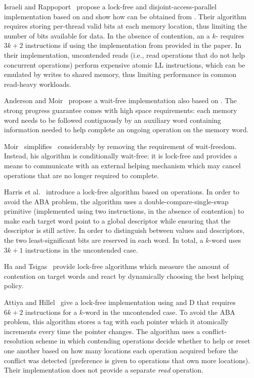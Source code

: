 Israeli and Rappoport~\cite{israeli94} propose a lock-free and disjoint-access-parallel implementation based on \llsc{} and show how \llsc{} can be obtained from \cas{}. Their algorithm requires storing per-thread valid bits at each memory location, thus limiting the number of bits available for data. In the absence of contention, an a $k$-\cas{} requires $3k+2$ \cas{} instructions if using the \llsc{} implementation from \cas{} provided in the paper. In their implementation, uncontended reads (i.e., read operations that do not help concurrent \mcas{} operations) perform expensive atomic \textsf{LL} instructions, which can be emulated by writes to shared memory, thus limiting performance in common read-heavy workloads.

Anderson and Moir~\cite{anderson95} propose a wait-free implementation also based on \llsc{}. The strong progress guarantee comes with high space requirements: each memory word needs to be followed contiguously by an  auxiliary word containing information needed to help complete an ongoing operation on the memory word.

Moir~\cite{moir97} simplifies~\cite{anderson95} considerably by removing the requirement of wait-freedom. Instead, his algorithm is conditionally wait-free: it is lock-free and provides a means to communicate with an external helping mechanism which may cancel \mcas{} operations that are no longer required to complete.

Harris et al.~\cite{harris02} introduce a lock-free algorithm based on \cas{} operations. In order to avoid the ABA problem, the algorithm uses a double-compare-single-swap primitive (implemented using two \cas{} instructions, in the absence of contention) to make each target word point to a global \mcas{} descriptor while ensuring that the descriptor is still active. In order to distinguish between values and descriptors, the two least-significant bits are reserved in each word. In total, a $k$-word \mcas{} uses $3k+1$ \cas{} instructions in the uncontended case. 

Ha and Tsigas~\cite{ha03,ha04} provide lock-free algorithms which measure the amount of contention on \mcas{} target words and react by dynamically choosing the best helping policy.

Attiya and Hillel~\cite{attiya11} give a lock-free implementation using \cas{} and D\cas{} that requires $6k+2$ \cas{} instructions for a $k$-word \mcas{} in the uncontended case. To avoid the ABA problem, this algorithm stores a tag with each pointer which it atomically increments every time the pointer changes. The algorithm uses a conflict-resolution scheme in which contending operations decide whether to help or reset one another based on how many locations each operation acquired before the conflict was detected (preference is given to operations that own more locations). Their implementation does not provide a separate {\em read} operation.

